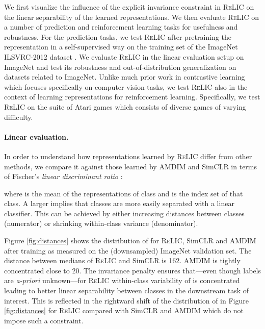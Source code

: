 \documentclass{article}
\newcommand{\relic}{\textsc{ReLIC}}
\begin{document}
We first visualize the influence of the explicit invariance constraint in \relic{} on the linear separability of the learned representations.
We then evaluate \relic{} on a number of prediction and reinforcement learning tasks for usefulness and robustness. 
For the prediction tasks, we test \relic{} after pretraining the representation in a self-supervised way on the training set of the ImageNet ILSVRC-2012 dataset \citep{Russakovsky2015ImageNetLS}.
We evaluate \relic{} in the linear evaluation setup on ImageNet and test its robustness and out-of-distribution generalization on datasets related to ImageNet. 
Unlike much prior work in contrastive learning which focuses specifically on computer vision tasks, we test \relic{} also in the context of learning representations for reinforcement learning. 
Specifically, we test \relic{} on the suite of Atari games \citep{Bellemare2013TheAL} which consists of  diverse games of varying difficulty.

\paragraph{Linear evaluation.} 
In order to understand how representations learned by \relic{} differ from other methods, we compare it against those learned by AMDIM and SimCLR in terms of Fischer's \emph{linear discriminant ratio} \citep{friedman2001elements}:

where  is the mean of the representations of class  and  is the index set of that class. 
A larger  implies that classes are more easily separated with a linear classifier. This can be achieved by either increasing distances between classes (numerator) or shrinking within-class variance (denominator).

Figure \ref{fig:distances} shows the distribution of  for \relic{}, SimCLR and AMDIM after training as measured on the (downsampled) ImageNet validation set. The distance between medians of \relic{} and SimCLR is 162. AMDIM is tightly concentrated close to 20. 
The invariance penalty ensures that---even though labels are \emph{a-priori} unknown---for \relic{} within-class variability of  is concentrated leading to better linear separability between classes in the downstream task of interest.
This is reflected in the rightward shift of the distribution of  in Figure \ref{fig:distances} for \relic{} compared with SimCLR and AMDIM which do not impose such a constraint. 
\end{document}
